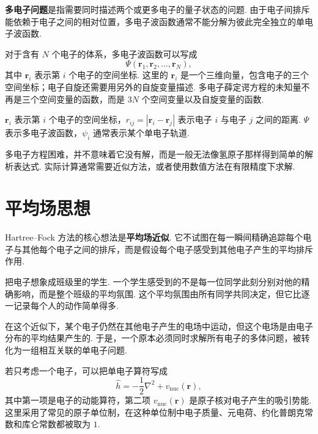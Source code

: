 \documentclass[UTF8,11pt,a4paper,openany]{ctexbook}
\newcommand{\term}[1]{\textbf{#1}}
\begin{document}
\begin{definitionbox}
\term{多电子问题}是指需要同时描述两个或更多电子的量子状态的问题. 由于电子间排斥能依赖于电子之间的相对位置，多电子波函数通常不能分解为彼此完全独立的单电子波函数. 
\end{definitionbox}

对于含有 $N$ 个电子的体系，多电子波函数可以写成
\[
\Psi(\mathbf r_1,\mathbf r_2,\ldots,\mathbf r_N),
\]
其中 $\mathbf r_i$ 表示第 $i$ 个电子的空间坐标. 这里的 $\mathbf r_i$ 是一个三维向量，包含电子的三个空间坐标；电子自旋还需要用另外的自旋变量描述. 多电子薛定谔方程的未知量不再是三个空间变量的函数，而是 $3N$ 个空间变量以及自旋变量的函数. 

\begin{notationbox}
$\mathbf r_i$ 表示第 $i$ 个电子的空间坐标，$r_{ij}=|\mathbf r_i-\mathbf r_j|$ 表示电子 $i$ 与电子 $j$ 之间的距离. $\Psi$ 表示多电子波函数，$\psi_i$ 通常表示某个单电子轨道. 
\end{notationbox}

\begin{limitbox}
多电子方程困难，并不意味着它没有解，而是一般无法像氢原子那样得到简单的解析表达式. 实际计算通常需要近似方法，或者使用数值方法在有限精度下求解. 
\end{limitbox}

\section{平均场思想}

Hartree--Fock 方法的核心想法是\term{平均场近似}. 它不试图在每一瞬间精确追踪每个电子与其他每个电子之间的排斥，而是假设每个电子感受到其他电子产生的平均排斥作用. 

\begin{analogybox}
把电子想象成班级里的学生. 一个学生感受到的不是每一位同学此刻分别对他的精确影响，而是整个班级的平均氛围. 这个平均氛围由所有同学共同决定，但它比逐一记录每个人的动作简单得多. 
\end{analogybox}

在这个近似下，某个电子仍然在其他电子产生的电场中运动，但这个电场是由电子分布的平均结果产生的. 于是，一个原本必须同时求解所有电子的多体问题，被转化为一组相互关联的单电子问题. 

若只考虑一个电子，可以把单电子算符写成
\[
\hat h=-\frac{1}{2}\nabla^2+v_{\mathrm{nuc}}(\mathbf r),
\]
其中第一项是电子的动能算符，第二项 $v_{\mathrm{nuc}}(\mathbf r)$ 是原子核对电子产生的吸引势能. 这里采用了常见的原子单位制，在这种单位制中电子质量、元电荷、约化普朗克常数和库仑常数都被取为 $1$. 
\end{document}
